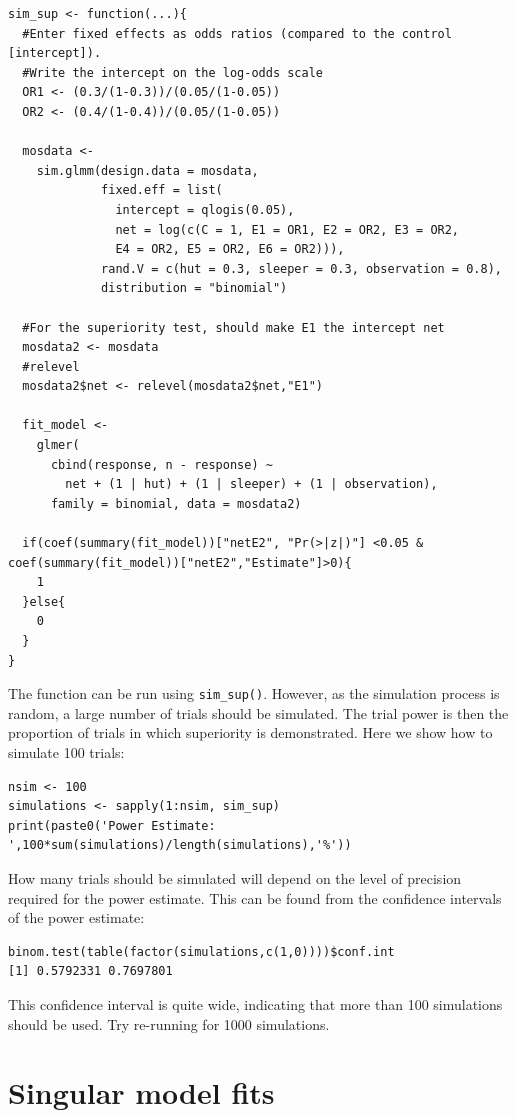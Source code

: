 \documentclass[11pt]{article}
\begin{document}
\begin{verbatim}
sim_sup <- function(...){
  #Enter fixed effects as odds ratios (compared to the control [intercept]).
  #Write the intercept on the log-odds scale
  OR1 <- (0.3/(1-0.3))/(0.05/(1-0.05))
  OR2 <- (0.4/(1-0.4))/(0.05/(1-0.05))
  
  mosdata <- 
    sim.glmm(design.data = mosdata,
             fixed.eff = list(
               intercept = qlogis(0.05),
               net = log(c(C = 1, E1 = OR1, E2 = OR2, E3 = OR2,
               E4 = OR2, E5 = OR2, E6 = OR2))),
             rand.V = c(hut = 0.3, sleeper = 0.3, observation = 0.8),
             distribution = "binomial")
  
  #For the superiority test, should make E1 the intercept net
  mosdata2 <- mosdata
  #relevel
  mosdata2$net <- relevel(mosdata2$net,"E1") 
  
  fit_model <-
    glmer(
      cbind(response, n - response) ~
        net + (1 | hut) + (1 | sleeper) + (1 | observation),
      family = binomial, data = mosdata2)
  
  if(coef(summary(fit_model))["netE2", "Pr(>|z|)"] <0.05 & coef(summary(fit_model))["netE2","Estimate"]>0){
    1
  }else{
    0
  }
}
\end{verbatim}
The function can be run using \verb+sim_sup()+. However, as the simulation process is random, a large number of trials should be simulated. The trial power is then the proportion of trials in which superiority is demonstrated. Here we show how to simulate 100 trials:
\begin{verbatim}
nsim <- 100
simulations <- sapply(1:nsim, sim_sup)
print(paste0('Power Estimate: ',100*sum(simulations)/length(simulations),'%'))
\end{verbatim}
How many trials should be simulated will depend on the level of precision required for the power estimate. This can be found from the confidence intervals of the power estimate:
\begin{verbatim}
binom.test(table(factor(simulations,c(1,0))))$conf.int
[1] 0.5792331 0.7697801
\end{verbatim}
This confidence interval is quite wide, indicating that more than 100 simulations should be used. Try re-running for 1000 simulations.

\section*{Singular model fits}
\end{document}
